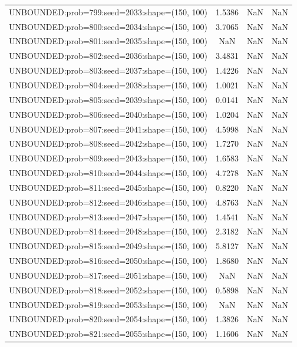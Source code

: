 \begin{longtable}{lccc}
UNBOUNDED:prob=799:seed=2033:shape=(150, 100) &  1.5386 &   NaN &    NaN \\
UNBOUNDED:prob=800:seed=2034:shape=(150, 100) &  3.7065 &   NaN &    NaN \\
UNBOUNDED:prob=801:seed=2035:shape=(150, 100) &     NaN &   NaN &    NaN \\
UNBOUNDED:prob=802:seed=2036:shape=(150, 100) &  3.4831 &   NaN &    NaN \\
UNBOUNDED:prob=803:seed=2037:shape=(150, 100) &  1.4226 &   NaN &    NaN \\
UNBOUNDED:prob=804:seed=2038:shape=(150, 100) &  1.0021 &   NaN &    NaN \\
UNBOUNDED:prob=805:seed=2039:shape=(150, 100) &  0.0141 &   NaN &    NaN \\
UNBOUNDED:prob=806:seed=2040:shape=(150, 100) &  1.0204 &   NaN &    NaN \\
UNBOUNDED:prob=807:seed=2041:shape=(150, 100) &  4.5998 &   NaN &    NaN \\
UNBOUNDED:prob=808:seed=2042:shape=(150, 100) &  1.7270 &   NaN &    NaN \\
UNBOUNDED:prob=809:seed=2043:shape=(150, 100) &  1.6583 &   NaN &    NaN \\
UNBOUNDED:prob=810:seed=2044:shape=(150, 100) &  4.7278 &   NaN &    NaN \\
UNBOUNDED:prob=811:seed=2045:shape=(150, 100) &  0.8220 &   NaN &    NaN \\
UNBOUNDED:prob=812:seed=2046:shape=(150, 100) &  4.8763 &   NaN &    NaN \\
UNBOUNDED:prob=813:seed=2047:shape=(150, 100) &  1.4541 &   NaN &    NaN \\
UNBOUNDED:prob=814:seed=2048:shape=(150, 100) &  2.3182 &   NaN &    NaN \\
UNBOUNDED:prob=815:seed=2049:shape=(150, 100) &  5.8127 &   NaN &    NaN \\
UNBOUNDED:prob=816:seed=2050:shape=(150, 100) &  1.8680 &   NaN &    NaN \\
UNBOUNDED:prob=817:seed=2051:shape=(150, 100) &     NaN &   NaN &    NaN \\
UNBOUNDED:prob=818:seed=2052:shape=(150, 100) &  0.5898 &   NaN &    NaN \\
UNBOUNDED:prob=819:seed=2053:shape=(150, 100) &     NaN &   NaN &    NaN \\
UNBOUNDED:prob=820:seed=2054:shape=(150, 100) &  1.3826 &   NaN &    NaN \\
UNBOUNDED:prob=821:seed=2055:shape=(150, 100) &  1.1606 &   NaN &    NaN \\

\end{longtable}
